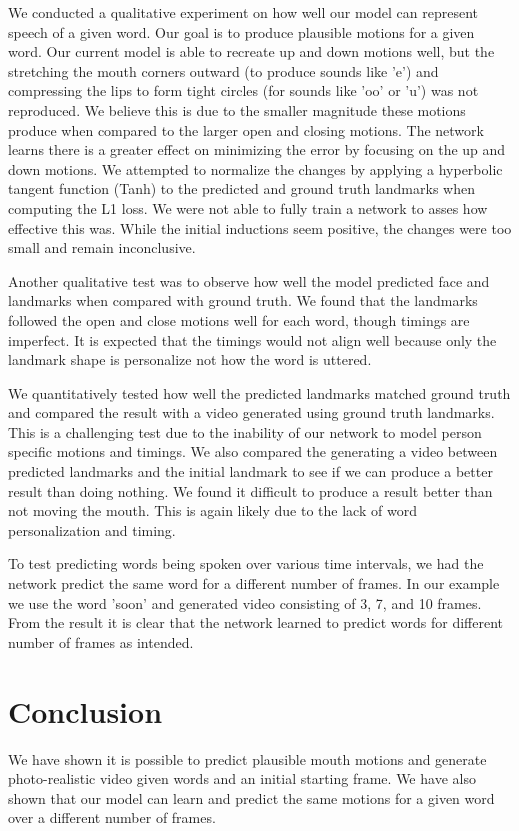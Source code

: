 \documentclass[10pt,twocolumn,letterpaper]{article}
\begin{document}
 We conducted a qualitative experiment on how well our model can represent speech of a given word. Our goal is to produce plausible motions for a given word. Our current model is able to recreate up and down motions well, but the stretching the mouth corners outward (to produce sounds like 'e') and compressing the lips to form tight circles (for sounds like 'oo' or 'u') was not reproduced. We believe this is due to the smaller magnitude these motions produce when compared to the larger open and closing motions. The network learns there is a greater effect on minimizing the error by focusing on the up and down motions. We attempted to normalize the changes by applying a hyperbolic tangent function (Tanh) to the predicted and ground truth landmarks when computing the L1 loss. We were not able to fully train a network to asses how effective this was. While the initial inductions seem positive, the changes were too small and remain inconclusive. 
 
 Another qualitative test was to observe how well the model predicted face and landmarks when compared with ground truth. We found that the landmarks followed the open and close motions well for each word, though timings are imperfect. It is expected that the timings would not align well because only the landmark shape is personalize not how the word is uttered. 
 
 We quantitatively tested how well the predicted landmarks matched ground truth and compared the result with a video generated using ground truth landmarks. This is a challenging test due to the inability of our network to model person specific motions and timings. We also compared the generating a video between predicted landmarks and the initial landmark to see if we can produce a better result than doing nothing. We found it difficult to produce a result better than not moving the mouth. This is again likely due to the lack of word personalization and timing.
 
 To test predicting words being spoken over various time intervals, we had the network predict the same word for a different number of frames. In our example we use the word 'soon' and generated video consisting of 3, 7, and 10 frames. From the result it is clear that the network learned to predict words for different number of frames as intended.
 
\section{Conclusion}
We have shown it is possible to predict plausible mouth motions and generate photo-realistic video given words and an initial starting frame. We have also shown that our model can learn and predict the same motions for a given word over a different number of frames.  

{\small


}
\end{document}
